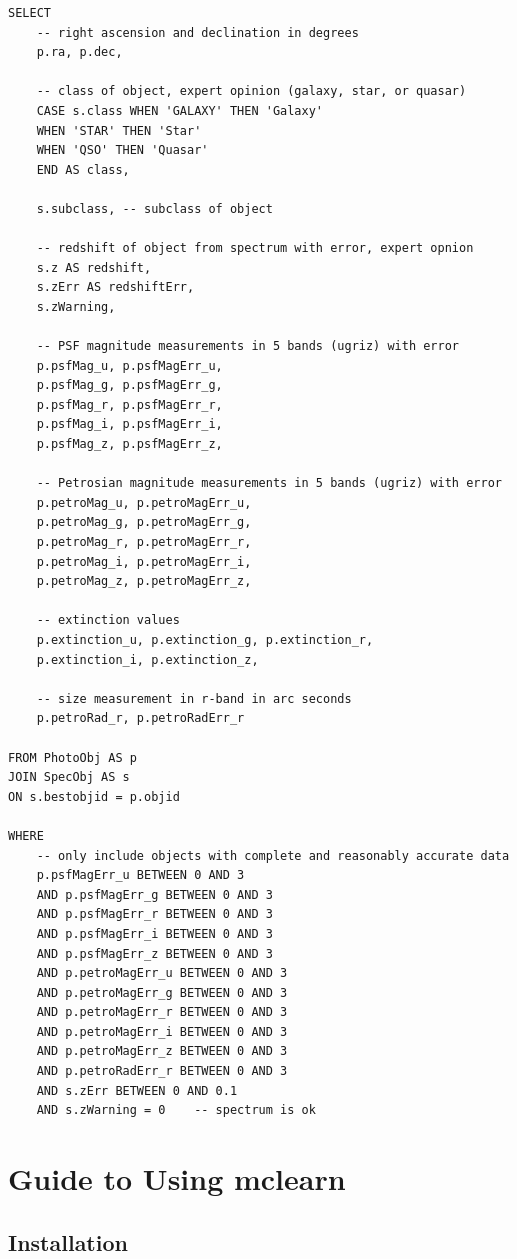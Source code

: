 \begin{verbatim}
SELECT
	-- right ascension and declination in degrees
	p.ra, p.dec,
	
	-- class of object, expert opinion (galaxy, star, or quasar)
	CASE s.class WHEN 'GALAXY' THEN 'Galaxy'
	WHEN 'STAR' THEN 'Star'
	WHEN 'QSO' THEN 'Quasar'
	END AS class,
	
	s.subclass, -- subclass of object
	
	-- redshift of object from spectrum with error, expert opnion
	s.z AS redshift,
	s.zErr AS redshiftErr,
	s.zWarning,
	
	-- PSF magnitude measurements in 5 bands (ugriz) with error
	p.psfMag_u, p.psfMagErr_u,
	p.psfMag_g, p.psfMagErr_g,
	p.psfMag_r, p.psfMagErr_r,
	p.psfMag_i, p.psfMagErr_i,
	p.psfMag_z, p.psfMagErr_z,
	
	-- Petrosian magnitude measurements in 5 bands (ugriz) with error
	p.petroMag_u, p.petroMagErr_u,
	p.petroMag_g, p.petroMagErr_g,
	p.petroMag_r, p.petroMagErr_r,
	p.petroMag_i, p.petroMagErr_i,
	p.petroMag_z, p.petroMagErr_z,
	
	-- extinction values
	p.extinction_u, p.extinction_g, p.extinction_r,
	p.extinction_i, p.extinction_z,
	
	-- size measurement in r-band in arc seconds
	p.petroRad_r, p.petroRadErr_r
	
FROM PhotoObj AS p
JOIN SpecObj AS s
ON s.bestobjid = p.objid

WHERE
	-- only include objects with complete and reasonably accurate data
	p.psfMagErr_u BETWEEN 0 AND 3
	AND p.psfMagErr_g BETWEEN 0 AND 3
	AND p.psfMagErr_r BETWEEN 0 AND 3
	AND p.psfMagErr_i BETWEEN 0 AND 3
	AND p.psfMagErr_z BETWEEN 0 AND 3
	AND p.petroMagErr_u BETWEEN 0 AND 3
	AND p.petroMagErr_g BETWEEN 0 AND 3
	AND p.petroMagErr_r BETWEEN 0 AND 3
	AND p.petroMagErr_i BETWEEN 0 AND 3
	AND p.petroMagErr_z BETWEEN 0 AND 3
	AND p.petroRadErr_r BETWEEN 0 AND 3
	AND s.zErr BETWEEN 0 AND 0.1
	AND s.zWarning = 0    -- spectrum is ok
\end{verbatim}



\chapter{Guide to Using mclearn}
\label{cha:mclearn}

\section{Installation}
\label{sec:installation}

